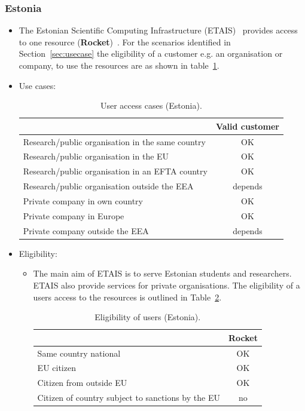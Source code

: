 \documentclass{article}
\begin{document}
\subsubsection{Estonia}
\begin{itemize}
    \item []
The Estonian Scientific Computing Infrastructure (ETAIS)~\cite{etais} provides access to one resource (\textbf{Rocket})~\cite{etais-rocket}. 
For the scenarios identified in Section~\ref{sec:usecase} the eligibility of a customer e.g. an organisation or company, to use the resources are as shown in table~\ref{tab:ET_use_cases}.
\end{itemize}
\begin{itemize}
\item[] Use cases:
    \begin{table}[!h]
        \centering
        \begin{tabular}{|l|c|}
        \hline
             & Valid customer  \\ 
        \hline
 Research/public organisation in the same country & OK \\
       \hline 
Research/public organisation in the EU &  OK\\
        \hline
Research/public organisation in an EFTA country & OK\\
        \hline
Research/public organisation outside the EEA & depends\\
        \hline
Private company in own country & OK\\
        \hline
Private company in Europe    & OK\\
        \hline
Private company outside the EEA & depends\\
        \hline 
        \end{tabular}
        \caption{User access cases (Estonia).}
        \label{tab:ET_use_cases}
    \end{table}
    
\item[]Eligibility:
\begin{itemize} 
\item[] The main aim of ETAIS is to serve Estonian students and researchers. 
ETAIS also provide services for private organisations. 
The eligibility of a users access to the resources is outlined in Table~\ref{tab:ET_user_elegibility}.
\begin{table}[!h]
    \centering
    \begin{tabular}{|l|c|}
        \hline
    & Rocket  \\
    \hline
  Same country national      & OK \\
    \hline
    EU citizen       &  OK\\
        \hline
        Citizen from outside EU	         &  OK\\
        \hline
        Citizen of country subject to sanctions by the EU  & no\\
        \hline
        \end{tabular}
    \caption{Eligibility of users (Estonia).}
    \label{tab:ET_user_elegibility}
\end{table}
\end{itemize} 


\end{itemize}
\end{document}
